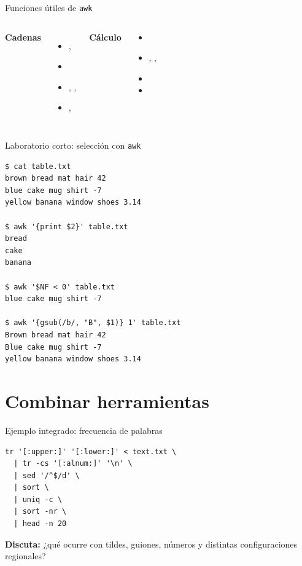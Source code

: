 \documentclass[aspectratio=169,11pt]{beamer}
\begin{document}
\begin{frame}[fragile]{Funciones útiles de \texttt{awk}}
  \begin{columns}[T,onlytextwidth]
      \textbf{Cadenas}
      \begin{itemize}
        \item {}, 
        \item {}
        \item {}, , 
        \item {}, 
      \end{itemize}
      \textbf{Cálculo}
      \begin{itemize}
        \item \term{+ - * / \% \^}
        \item {}, , 
        \item \term{== != < <= > >=}
        \item \term{\&\& || !}
      \end{itemize}
  \end{columns}
\end{frame}

\begin{frame}[fragile]{Laboratorio corto: selección con \texttt{awk}}
\begin{lstlisting}[basicstyle=\ttfamily\fontsize{7}{8}\selectfont\color{Paper}]
$ cat table.txt
brown bread mat hair 42
blue cake mug shirt -7
yellow banana window shoes 3.14

$ awk '{print $2}' table.txt
bread
cake
banana

$ awk '$NF < 0' table.txt
blue cake mug shirt -7

$ awk '{gsub(/b/, "B", $1)} 1' table.txt
Brown bread mat hair 42
Blue cake mug shirt -7
yellow banana window shoes 3.14
\end{lstlisting}
\end{frame}

\section{Combinar herramientas}

\begin{frame}[fragile]{Ejemplo integrado: frecuencia de palabras}
\begin{lstlisting}
tr '[:upper:]' '[:lower:]' < text.txt \
  | tr -cs '[:alnum:]' '\n' \
  | sed '/^$/d' \
  | sort \
  | uniq -c \
  | sort -nr \
  | head -n 20
\end{lstlisting}
  \vspace{3mm}
  \textbf{Discuta:} ¿qué ocurre con tildes, guiones, números y distintas configuraciones regionales?
\end{frame}
\end{document}
